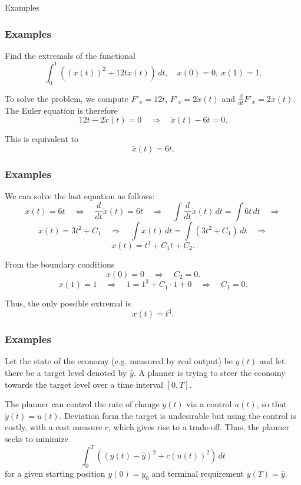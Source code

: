 \documentclass[10pt]{beamer}
\theoremstyle{definition}
\begin{document}
\begin{section}{Examples}\label{sec:Ex}

\begin{frame}[fragile]
\frametitle{Examples}
\begin{example}
Find the extremals of the functional \[ \int_0^1 \left((\dot{x}(t))^2 +12 t x(t) \right) \,dt, \quad x(0)=0,~x(1)=1.\] \bigskip

To solve the problem, we compute $ F'_x = 12t $, $ F'_{\dot{x}} = 2 \dot{x}(t) $ and $ \frac{d}{dt}F'_{\dot{x}} = 2 \ddot{x}(t) $. The Euler equation is therefore \[ 12t - 2 \ddot{x}(t) = 0\quad \Rightarrow \quad  \ddot{x}(t) - 6t = 0.\]

This is equivalent to  \[ \ddot{x}(t) = 6t. \] 
\label{ex:ex1}
\end{example}
\end{frame}

\begin{frame}[fragile]
\frametitle{Examples}\addtocounter{theorem}{-1}
\begin{example}[cont.]
We can solve the last equation as follows:
\[ \ddot{x}(t) = 6t \quad \Leftrightarrow \quad \frac{d}{dt}\dot{x}(t) = 6t \quad \Rightarrow \quad \int \frac{d}{dt}\dot{x}(t) \,dt = \int 6t \,dt \quad \Rightarrow  \]
\[ \dot{x}(t) = 3t^2 + C_1 \quad \Rightarrow \quad \int \dot{x}(t) \,dt = \int(3t^2 + C_1)\,dt \quad \Rightarrow \]
\[ x(t) = t^3 + C_1 t + C_2 .\]

From the boundary conditions \[ x(0)=0  \quad \Rightarrow \quad C_2 = 0. \]
\[ x(1)=1   \quad \Rightarrow \quad 1 = 1^3 + C_1 \cdot 1+ 0\quad \Rightarrow \quad C_1 = 0.\]

Thus, the only possible extremal is \[ x(t)=t^3. \]
\end{example}
\end{frame}

\begin{frame}[fragile]
\frametitle{Examples}
\begin{example}
Let the state of the economy (e.g. measured by real output) be $ y(t) $ and let there be a target level denoted by $ \hat{y} $. A planner is trying to steer the economy towards the target level over a time interval $ [0,T] $. 

The planner can control the rate of change $ \dot{y}(t) $ via a control $ u(t) $, so that $ \dot{y}(t)=u(t) $. Deviation form the target is undesirable but using the control is costly, with a cost measure $ c $, which gives rise to a trade-off. Thus, the planner seeks to minimize 
\[ \int_{0}^{T}\left( (y(t)-\hat{y})^2 + c (u(t))^2 \right)\,dt \] for a given starting position $ y(0)=y_0 $ and terminal requirement $ y(T)=\hat{y} $.
\label{ex:ex2}
\end{example}
\end{frame}


\end{section}
\end{document}
